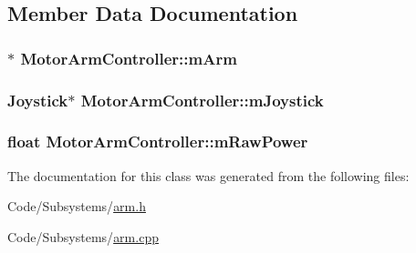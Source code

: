 \subsection{\-Member \-Data \-Documentation}
\hypertarget{class_motor_arm_controller_a149d1988cb596750890076784342e351}{
\subsubsection[{m\-Arm}]{$\ast$ {\bf \-Motor\-Arm\-Controller\-::m\-Arm}}}\label{class_motor_arm_controller_a149d1988cb596750890076784342e351}
\hypertarget{class_motor_arm_controller_a6a5b5137268f126d0d71cd1d39d2542e}{
\subsubsection[{m\-Joystick}]{\setlength{\rightskip}{0pt plus 5cm}\-Joystick$\ast$ {\bf \-Motor\-Arm\-Controller\-::m\-Joystick}}}\label{class_motor_arm_controller_a6a5b5137268f126d0d71cd1d39d2542e}
\hypertarget{class_motor_arm_controller_a93a818b75f8b0a7c94bcfbfe1a7130f5}{
\subsubsection[{m\-Raw\-Power}]{\setlength{\rightskip}{0pt plus 5cm}float {\bf \-Motor\-Arm\-Controller\-::m\-Raw\-Power}}}\label{class_motor_arm_controller_a93a818b75f8b0a7c94bcfbfe1a7130f5}


\-The documentation for this class was generated from the following files\-:\begin{DoxyCompactItemize}
\item 
\-Code/\-Subsystems/\hyperlink{arm_8h}{arm.\-h}\item 
\-Code/\-Subsystems/\hyperlink{arm_8cpp}{arm.\-cpp}\end{DoxyCompactItemize}

